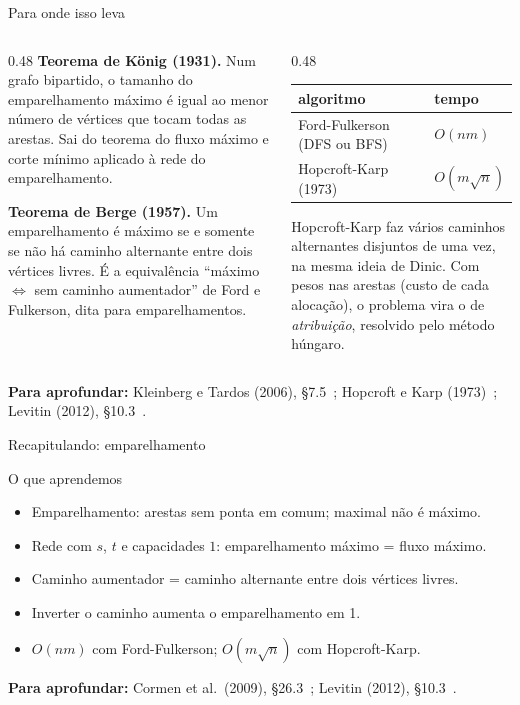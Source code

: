 \documentclass[aspectratio=169,xcolor=table]{beamer}
\newcommand{\fonte}[1]{%
  \vfill
  {\tiny\color{gray!55!black}\textbf{Para aprofundar:} #1\par}%
}
\begin{document}
\begin{frame}{Para onde isso leva}
  \begin{columns}[T]
    \begin{column}{0.48\textwidth}
      \scriptsize
      \textbf{Teorema de König (1931).} Num grafo bipartido, o tamanho do emparelhamento
      máximo é igual ao menor número de vértices que tocam todas as arestas. Sai do teorema
      do fluxo máximo e corte mínimo aplicado à rede do emparelhamento.
      \medskip

      \textbf{Teorema de Berge (1957).} Um emparelhamento é máximo se e somente se não há
      caminho alternante entre dois vértices livres. É a equivalência ``máximo $\Leftrightarrow$
      sem caminho aumentador'' de Ford e Fulkerson, dita para emparelhamentos.
    \end{column}
    \begin{column}{0.48\textwidth}
      \scriptsize
      \centering
      \begin{tabular}{ll}
        \toprule
        algoritmo & tempo \\
        \midrule
        Ford-Fulkerson (DFS ou BFS) & $O(nm)$ \\
        Hopcroft-Karp (1973) & $O(m\sqrt{n})$ \\
        \bottomrule
      \end{tabular}
      \medskip

      \raggedright
      Hopcroft-Karp faz vários caminhos alternantes disjuntos de uma vez, na mesma ideia de
      Dinic. Com pesos nas arestas (custo de cada alocação), o problema vira o de
      \emph{atribuição}, resolvido pelo método húngaro.
    \end{column}
  \end{columns}
  \fonte{Kleinberg e Tardos (2006), \S 7.5~\cite{kleinberg2006algorithm};
    Hopcroft e Karp (1973)~\cite{hopcroft1973n52}; Levitin (2012), \S 10.3~\cite{levitin2012introduction}.}
\end{frame}

\begin{frame}{Recapitulando: emparelhamento}
  \begin{block}{O que aprendemos}
    \begin{itemize}
      \item Emparelhamento: arestas sem ponta em comum; maximal não é máximo.
      \item Rede com $s$, $t$ e capacidades $1$: emparelhamento máximo = fluxo máximo.
      \item Caminho aumentador = caminho alternante entre dois vértices livres.
      \item Inverter o caminho aumenta o emparelhamento em 1.
      \item $O(nm)$ com Ford-Fulkerson; $O(m\sqrt{n})$ com Hopcroft-Karp.
    \end{itemize}
  \end{block}
  \fonte{Cormen et al.\ (2009), \S 26.3~\cite{cormen2009introduction};
    Levitin (2012), \S 10.3~\cite{levitin2012introduction}.}
\end{frame}
\end{document}
